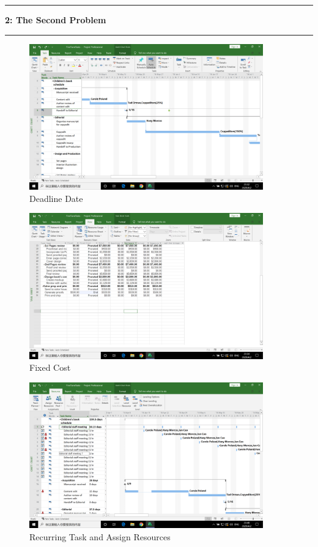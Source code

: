 \documentclass[11pt]{article}
\newcommand\question[2]{\vspace{.25in}\hrule\textbf{#1: #2}\vspace{.5em}\hrule\vspace{.10in}}
\begin{document}
\question{2}{The Second Problem}
\begin{figure}[H]
    \centering
    \includegraphics[width=0.9\textwidth]{deadline}
    \caption{Deadline Date}
\end{figure}
\begin{figure}[H]
    \centering
    \includegraphics[width=0.9\textwidth]{fixed}
    \caption{Fixed Cost}
\end{figure}
\begin{figure}[H]
    \centering
    \includegraphics[width=0.9\textwidth]{recurring}
    \caption{Recurring Task and Assign Resources}
\end{figure}
\end{document}
